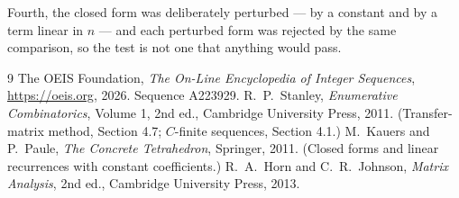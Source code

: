 \documentclass[11pt,a4paper]{article}
\theoremstyle{plain}
\theoremstyle{definition}
\begin{document}
Fourth, the closed form was deliberately perturbed --- by a constant and by a term linear in
$n$ --- and each perturbed form was rejected by the same comparison, so the test is not one
that anything would pass.

\begin{thebibliography}{9}
 The OEIS Foundation, \emph{The On-Line Encyclopedia of Integer
Sequences}, \url{https://oeis.org}, 2026. Sequence A223929.
 R.~P.~Stanley, \emph{Enumerative Combinatorics}, Volume 1, 2nd ed.,
Cambridge University Press, 2011. (Transfer-matrix method, Section 4.7; $C$-finite sequences,
Section 4.1.)
 M.~Kauers and P.~Paule, \emph{The Concrete Tetrahedron}, Springer, 2011.
(Closed forms and linear recurrences with constant coefficients.)
 R.~A.~Horn and C.~R.~Johnson, \emph{Matrix Analysis}, 2nd ed., Cambridge
University Press, 2013.
\end{thebibliography}
\end{document}
